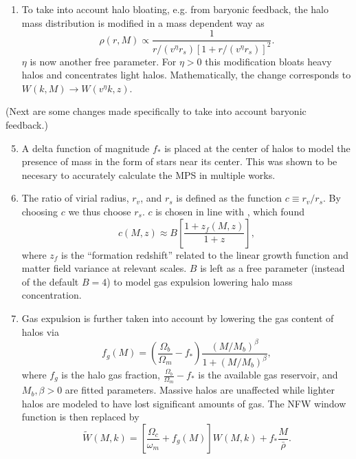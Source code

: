 \documentclass[11pt]{book}
\newcommand{\br}[1]{\ensuremath{\left( #1 \right)}}
\newcommand{\sbr}[1]{\ensuremath{\left[ #1 \right]}}
\begin{document}
\begin{enumerate}
    \begin{equation}
        P^{1H}(k,z)\rightarrow P^{1H}(k,z) \frac{(k/k_*)^4}{1+(k/k_*)^4},
    \end{equation}
    where $k_*$ is another free parameter.
    \item To take into account halo bloating, e.g. from baryonic feedback, the halo mass distribution is modified in a mass dependent way as
    \begin{equation}
        \rho (r, M) \propto \frac{1}{r/(v^\eta r_s)\sbr{1+r/(v^\eta r_s)}^2}.
    \end{equation}
    $\eta$ is now another free parameter. For $\eta>0$ this modification bloats heavy halos and concentrates light halos. Mathematically, the change corresponds to $W(k, M) \rightarrow W(v^{\eta}k, z)$.
\end{enumerate}
(Next are some changes made specifically to take into account baryonic feedback.)
\begin{enumerate}
    \setcounter{enumi}{4}
    \item A delta function of magnitude $f_*$ is placed at the center of halos to model the presence of mass in the form of stars near its center. This was shown to be necesary to accurately calculate the MPS in multiple works. %
    \item The ratio of virial radius, $r_v$, and $r_s$ is defined as the function $c\equiv r_v/r_s$. By choosing $c$ we thus choose $r_s$. $c$ is chosen in line with \cite{Bullock_2001}, which found
    \begin{equation}
        c(M,z) \approx B\sbr{\frac{1+z_f(M,z)}{1+z}},
    \end{equation}
    where $z_f$ is the ``formation redshift'' related to the linear growth function and matter field variance at relevant scales. $B$ is left as a free parameter (instead of the default $B=4$) to model gas expulsion lowering halo mass concentration.
    \item Gas expulsion is further taken into account by lowering the gas content of halos via
    \begin{equation}
        f_g(M)=\br{\frac{\Omega_b}{\Omega_m}-f_*}\frac{(M/M_b)^\beta}{1+(M/M_b)^\beta},
    \end{equation}
    where $f_g$ is the halo gas fraction, $\frac{\Omega_b}{\Omega_m}-f_*$ is the available gas reservoir, and $M_b, \beta > 0$ are fitted parameters. Massive halos are unaffected while lighter halos are modeled to have lost significant amounts of gas.
    The NFW window function is then replaced by
    \begin{equation}
        \tilde W(M,k) = \sbr{\frac{\Omega_c}{\omega_m}+f_g(M)}W(M,k) + f_* \frac{M}{\bar \rho}.
    \end{equation}
\end{enumerate}
\end{document}
